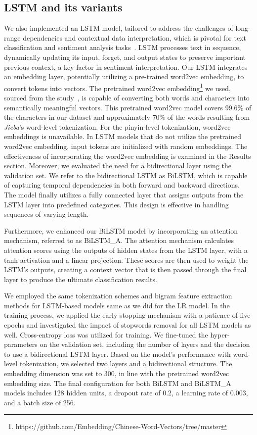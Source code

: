 \subsection{LSTM and its variants}
We also implemented an LSTM model, tailored to address the challenges of long-range dependencies and contextual data interpretation, which is pivotal for text classification and sentiment analysis tasks~\citep{sun2022word, yuan2023}. LSTM processes text in sequence, dynamically updating its input, forget, and output states to preserve important previous context, a key factor in sentiment interpretation. Our LSTM integrates an embedding layer, potentially utilizing a pre-trained word2vec embedding, to convert tokens into vectors. The pretrained word2vec embedding\footnote{https://github.com/Embedding/Chinese-Word-Vectors/tree/master} we used, sourced from the study~\citep{li2018ana}, is capable of converting both words and characters into semantically meaningful vectors. This pretrained word2vec model covers 99.6\% of the characters in our dataset and approximately 70\% of the words resulting from \textit{Jieba}'s word-level tokenization. For the pinyin-level tokenization, word2vec embeddings is unavailable. In LSTM models that do not utilize the pretrained word2vec embedding, input tokens are initialized with random embeddings. The effectiveness of incorporating the word2vec embedding is examined in the Results section. Moreover, we evaluated the need for a bidirectional layer using the validation set. We refer to the bidirectional LSTM as BiLSTM, which is capable of capturing temporal dependencies in both forward and backward directions. The model finally utilizes a fully connected layer that assigns outputs from the LSTM layer into predefined categories. This design is effective in handling sequences of varying length.

Furthermore, we enhanced our BiLSTM model by incorporating an attention mechanism, referred to as BiLSTM\_A. The attention mechanism calculates attention scores using the outputs of hidden states from the LSTM layer, with a tanh activation and a linear projection. These scores are then used to weight the LSTM's outputs, creating a context vector that is then passed through the final layer to produce the ultimate classification results.

We employed the same tokenization schemes and bigram feature extraction methods for LSTM-based models same as we did for the LR model. In the training process, we applied the early stopping mechanism with a patience of five epochs and investigated the impact of stopwords removal for all LSTM models as well. Cross-entropy loss was utilized for training. We fine-tuned the hyper-parameters on the validation set, including the number of layers and the decision to use a bidirectional LSTM layer. Based on the model's performance with word-level tokenization, we selected two layers and a bidirectional structure. The embedding dimension was set to 300, in line with the pretrained word2vec embedding size. The final configuration for both BiLSTM and BiLSTM\_A models includes 128 hidden units, a dropout rate of 0.2, a learning rate of 0.003, and a batch size of 256.


